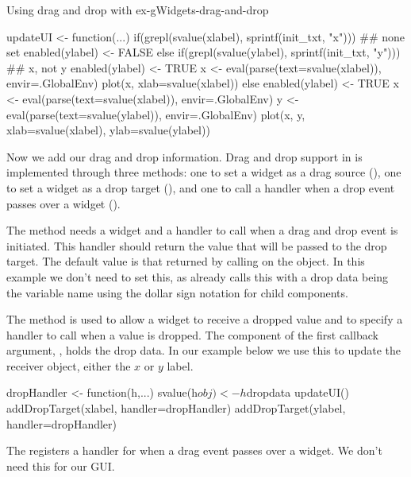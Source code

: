 \begin{example}{Using drag and drop with }{ex-gWidgets-drag-and-drop}
\begin{Schunk}
\begin{Sinput}
 updateUI <- function(...) {
   if(grepl(svalue(xlabel), sprintf(init_txt, "x"))) {
     ## none set
     enabled(ylabel) <- FALSE
   } else if(grepl(svalue(ylabel), sprintf(init_txt, "y"))) {
     ## x, not y
     enabled(ylabel) <- TRUE
     x <- eval(parse(text=svalue(xlabel)), envir=.GlobalEnv)
     plot(x, xlab=svalue(xlabel))
   } else {
     enabled(ylabel) <- TRUE    
     x <- eval(parse(text=svalue(xlabel)), envir=.GlobalEnv)
     y <- eval(parse(text=svalue(ylabel)), envir=.GlobalEnv)
     plot(x, y, xlab=svalue(xlabel), ylab=svalue(ylabel))
   }
 }
\end{Sinput}
\end{Schunk}

Now we add our drag and drop information.  Drag and drop support in
 is implemented through three methods: one to set a
widget as a drag source (), one to set a widget
as a drop target (), and one to call a handler
when a drop event passes over a widget ().
  

The  method needs a widget and a handler to
call when a drag and drop event is initiated. This handler should
return the value that will be passed to the drop target. The default
value is that returned by calling  on the object. In this
example we don't need to set this, as  already
calls this with a drop data being the variable name using the dollar
sign notation for child components.
    
The  method is used to allow a widget to
receive a dropped value and to specify a handler to call when a value
is dropped. The  component of the first callback
argument, , holds the drop data. In our example below we use
this to update the receiver object, either the $x$ or $y$ label.

\begin{Schunk}
\begin{Sinput}
 dropHandler <- function(h,...) {
   svalue(h$obj) <- h$dropdata
   updateUI()
 }
 addDropTarget(xlabel, handler=dropHandler)
 addDropTarget(ylabel, handler=dropHandler)
\end{Sinput}
\end{Schunk}


The  registers a handler for when a drag event
passes over a widget. We don't need this for our GUI.
    
\end{example}



